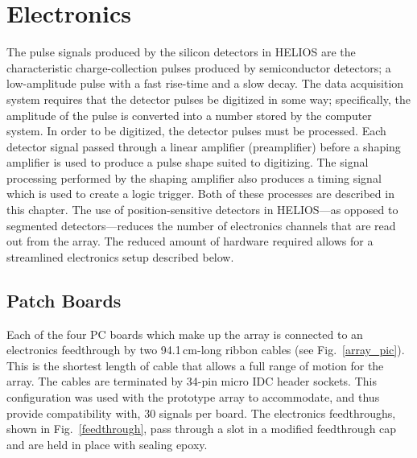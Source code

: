 \chapter{Electronics}
\label{ch:elec}
The pulse signals produced by the silicon detectors in HELIOS are the characteristic charge-collection pulses produced by semiconductor detectors; a low-amplitude pulse with a fast rise-time and a slow decay.  The data acquisition system requires that the detector pulses be digitized in some way; specifically, the amplitude of the pulse is converted into a number stored by the computer system.  In order to be digitized, the detector pulses must be processed.  Each detector signal passed through a linear amplifier (preamplifier) before a shaping amplifier is used to produce a pulse shape suited to digitizing.  The signal processing performed by the shaping amplifier also produces a timing signal which is used to create a logic trigger.  Both of these processes are described in this chapter.  The use of position-sensitive detectors in HELIOS---as opposed to segmented detectors---reduces the number of electronics channels that are read out from the array.  The reduced amount of hardware required allows for a streamlined electronics setup described below.  

\section{Patch Boards}
Each of the four PC boards which make up the array is connected to an electronics feedthrough by two 94.1\,cm-long ribbon cables (see Fig.~\ref{array_pic}).  This is the shortest length of cable that allows a full range of motion for the array.  The cables are terminated by 34-pin micro IDC header sockets.  This configuration was used with the prototype array to accommodate, and thus provide compatibility with, 30 signals per board.  The electronics feedthroughs, shown in Fig.~\ref{feedthrough}, pass through a slot in a modified feedthrough cap and are held in place with sealing epoxy.

